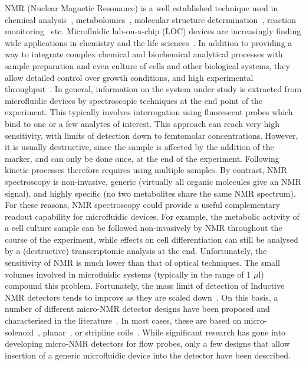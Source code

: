 \documentclass[preprint,12pt]{article}
\begin{document}
NMR (Nuclear Magnetic Resonance) is a well established technique used in chemical analysis~\cite{NMR-chemical-1995, hills1994magnetic, rabenstein1991quantitative}, metabolomics~\cite{nmr-metabolomics-future-2017,nmr-metabolomics-2016}, molecular structure determination~\cite{wuthrich1990protein}, reaction monitoring~\cite{maiwald2004quantitative} etc. Microfluidic lab-on-a-chip (LOC) devices are increasingly finding wide applications in chemistry and the life sciences~\cite{whitesides2006origins,mark2010microfluidic}. In addition to providing a way to integrate complex chemical and biochemical analytical processes with sample preparation and even culture of cells and other biological systems, they allow detailed control over growth conditions, and high experimental throughput~\cite{cellonchip-2006,cellonchip-review,tissueonchip-2008}. In general, information on the system under study is extracted from microfluidic devices by spectroscopic techniques at the end point of the experiment. This typically involves interrogation using fluorescent probes which bind to one or a few analytes of interest. This approach can reach very high sensitivity, with limits of detection down to femtomolar concentrations. However, it is usually destructive, since the sample is affected by the addition of the marker, and can only be done once, at the end of the experiment. Following kinetic processes therefore requires using multiple samples. By contrast, NMR spectroscopy is non-invasive, generic (virtually all organic molecules give an NMR signal), and highly specific (no two metabolites share the same NMR spectrum). For these reasons, NMR spectroscopy could provide a useful complementary readout capability for microfluidic devices. For example, the metabolic activity of a cell culture sample can be followed non-invasively by NMR throughout the course of the experiment, while effects on cell differentiation can still be analysed by a (destructive) transcriptomic analysis at the end. Unfortunately, the sensitivity of NMR is much lower than that of optical techniques. The small volumes involved in microfluidic systems (typically in the range of 1 $\mu$l) compound this problem. Fortunately, the mass limit of detection of Inductive NMR detectors tends to improve as they are scaled down~\cite{Olson1995}. On this basis, a number of different micro-NMR detector designs have been proposed and characterised in the literature~\cite{utz2012review,micronmr2014review}. In most cases, these are based on micro-solenoid~\cite{SUBRAMANIAN1998,Pines2007}, planar~\cite{Maguire2007,dieter2008,EHRMANN200}, or stripline coils~\cite{stripline_jan}. While significant research has gone into developing micro-NMR detectors for flow probes, only a few designs that allow insertion of a generic microfluidic device into the detector have been described.\par
\end{document}
